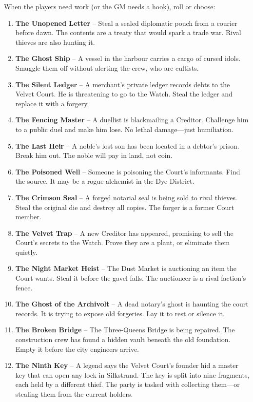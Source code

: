 \documentclass[10pt,twoside]{book}
\begin{document}
When the players need work (or the GM needs a hook), roll or choose:

\begin{enumerate}
\item \textbf{The Unopened Letter} -- Steal a sealed diplomatic pouch from a courier before dawn. The contents are a treaty that would spark a trade war. Rival thieves are also hunting it.
\item \textbf{The Ghost Ship} -- A vessel in the harbour carries a cargo of cursed idols. Smuggle them off without alerting the crew, who are cultists.
\item \textbf{The Silent Ledger} -- A merchant's private ledger records debts to the Velvet Court. He is threatening to go to the Watch. Steal the ledger and replace it with a forgery.
\item \textbf{The Fencing Master} -- A duellist is blackmailing a Creditor. Challenge him to a public duel and make him lose. No lethal damage---just humiliation.
\item \textbf{The Last Heir} -- A noble's lost son has been located in a debtor's prison. Break him out. The noble will pay in land, not coin.
\item \textbf{The Poisoned Well} -- Someone is poisoning the Court's informants. Find the source. It may be a rogue alchemist in the Dye District.
\item \textbf{The Crimson Seal} -- A forged notarial seal is being sold to rival thieves. Steal the original die and destroy all copies. The forger is a former Court member.
\item \textbf{The Velvet Trap} -- A new Creditor has appeared, promising to sell the Court's secrets to the Watch. Prove they are a plant, or eliminate them quietly.
\item \textbf{The Night Market Heist} -- The Dust Market is auctioning an item the Court wants. Steal it before the gavel falls. The auctioneer is a rival faction's fence.
\item \textbf{The Ghost of the Archivolt} -- A dead notary's ghost is haunting the court records. It is trying to expose old forgeries. Lay it to rest or silence it.
\item \textbf{The Broken Bridge} -- The Three-Queens Bridge is being repaired. The construction crew has found a hidden vault beneath the old foundation. Empty it before the city engineers arrive.
\item \textbf{The Ninth Key} -- A legend says the Velvet Court's founder hid a master key that can open any lock in Silkstrand. The key is split into nine fragments, each held by a different thief. The party is tasked with collecting them---or stealing them from the current holders.
\end{enumerate}
\end{document}
